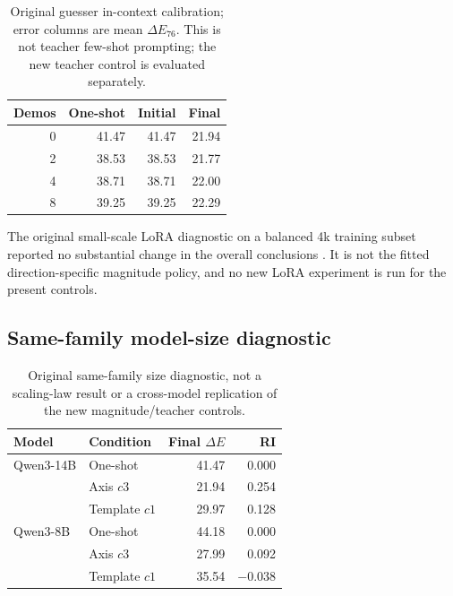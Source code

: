 \begin{table}[H]
\centering\small
\begin{tabular}{@{}rrrr@{}}
\toprule
Demos & One-shot & Initial & Final \\
\midrule
0 & 41.47 & 41.47 & 21.94 \\
2 & 38.53 & 38.53 & 21.77 \\
4 & 38.71 & 38.71 & 22.00 \\
8 & 39.25 & 39.25 & 22.29 \\
\bottomrule
\end{tabular}
\caption{Original guesser in-context calibration; error columns are
mean $\Delta E_{76}$. This is not teacher
few-shot prompting; the new teacher control is evaluated separately.}
\end{table}

The original small-scale LoRA diagnostic on a balanced 4k training subset
reported no substantial change in the overall conclusions
\citep{hu2022lora}. It is not the fitted direction-specific magnitude
policy, and no new LoRA experiment is run for the present controls.

\subsection{Same-family model-size diagnostic}
\begin{table}[H]
\centering\small
\begin{tabular}{@{}llrr@{}}
\toprule
Model & Condition & Final $\Delta E$ & RI \\
\midrule
Qwen3-14B & One-shot & 41.47 & 0.000 \\
 & Axis $c3$ & 21.94 & 0.254 \\
 & Template $c1$ & 29.97 & 0.128 \\
Qwen3-8B & One-shot & 44.18 & 0.000 \\
 & Axis $c3$ & 27.99 & 0.092 \\
 & Template $c1$ & 35.54 & $-0.038$ \\
\bottomrule
\end{tabular}
\caption{Original same-family size diagnostic, not a scaling-law result or
a cross-model replication of the new magnitude/teacher controls.}
\end{table}
